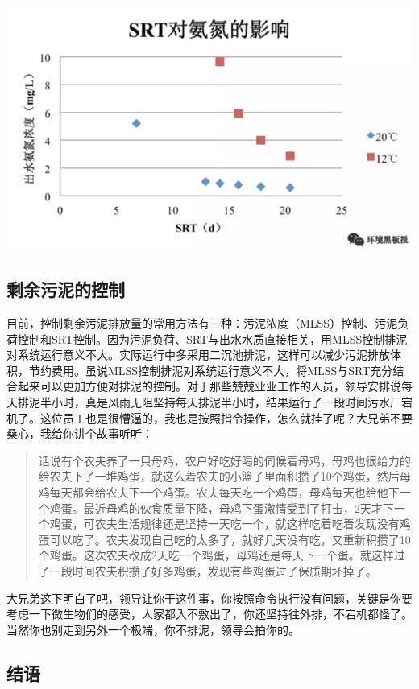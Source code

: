 \documentclass[]{book}
\begin{document}
\includegraphics[width=8.33in]{images/srt4}

\subsection{剩余污泥的控制}

目前，控制剩余污泥排放量的常用方法有三种：污泥浓度（MLSS）控制、污泥负荷控制和SRT控制。因为污泥负荷、SRT与出水水质直接相关，用MLSS控制排泥对系统运行意义不大。实际运行中多采用二沉池排泥，这样可以减少污泥排放体积，节约费用。虽说MLSS控制排泥对系统运行意义不大，将MLSS与SRT充分结合起来可以更加方便对排泥的控制。对于那些兢兢业业工作的人员，领导安排说每天排泥半小时，真是风雨无阻坚持每天排泥半小时，结果运行了一段时间污水厂宕机了。这位员工也是很懵逼的，我也是按照指令操作，怎么就挂了呢？大兄弟不要桑心，我给你讲个故事听听：

\begin{quote}
话说有个农夫养了一只母鸡，农户好吃好喝的伺候着母鸡，母鸡也很给力的给农夫下了一堆鸡蛋，就这么着农夫的小篮子里面积攒了10个鸡蛋，然后母鸡每天都会给农夫下一个鸡蛋。农夫每天吃一个鸡蛋，母鸡每天也给他下一个鸡蛋。最近母鸡的伙食质量下降，母鸡下蛋激情受到了打击，2天才下一个鸡蛋，可农夫生活规律还是坚持一天吃一个，就这样吃着吃着发现没有鸡蛋可以吃了。农夫发现自己吃的太多了，就好几天没有吃，又重新积攒了10个鸡蛋。这次农夫改成2天吃一个鸡蛋，母鸡还是每天下一个蛋。就这样过了一段时间农夫积攒了好多鸡蛋，发现有些鸡蛋过了保质期坏掉了。
\end{quote}

大兄弟这下明白了吧，领导让你干这件事，你按照命令执行没有问题，关键是你要考虑一下微生物们的感受，人家都入不敷出了，你还坚持往外排，不宕机都怪了。当然你也别走到另外一个极端，你不排泥，领导会拍你的。

\subsection{结语}\label{-5}
\end{document}
